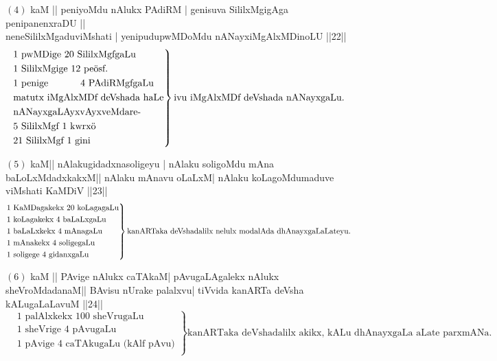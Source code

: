 \eject


$(4)$ kaM || peniyoMdu nAlukx PAdiRM | genisuva SililxMgigAga penipanenxraDU ||\\ 
neneSililxMgaduviMshati | yenipudupwMDoMdu nANayxiMgAlxMDinoLU ||22||
\begin{equation*}
\left.
\begin{aligned}
&\text{$1$ pwMDige $20$ SililxMgfgaLu}\\
&\text{$1$ SililxMgige $12$ pe\char'366sf.}\\
&\text{$1$ penige \qq $4$ PAdiRMgfgaLu}\\
&\text{matutx iMgAlxMDf deVshada haLe}\\
&\text{nANayxgaLAyxvAyxveMdare-}\\
&\text{$5$ SililxMgf $1$ kwrx\char'366}\\
&\text{$21$ SililxMgf $1$ gini}\\
\end{aligned}
\right\}
\text {ivu iMgAlxMDf deVshada nANayxgaLu.}
\end{equation*}

$(5)$ kaM|| nAlakugidadxnasoligeyu | nAlaku soligoMdu mAna baLoLxMdadxkakxM|| nAlaku mAnavu oLaLxM| nAlaku koLagoMdumaduve viMshati KaMDiV ||23||
\begin{equation*}
\left.
\begin{aligned}
&\text {$1$ KaMDagakekx $20$ koLagagaLu}\\
&\text {$1$ koLagakekx  $4$ baLaLxgaLu}\\
&\text {$1$ baLaLxkekx $4$ mAnagaLu}\\
&\text {$1$ mAnakekx $4$ soligegaLu}\\
&\text {$1$ soligege $4$ gidanxgaLu}\\
\end{aligned}
\right\}
\text {kanARTaka deVshadalilx nelulx modalAda dhAnayxgaLaLateyu.}\\
\end{equation*}

$(6)$ kaM || PAvige nAlukx caTAkaM| pAvugaLAgalekx nAlukx sheVroMdadanaM|| BAvisu nUrake palalxvu| tiVvida kanARTa deVsha kALugaLaLavuM ||24||
\begin{equation*}
\left.
\begin{aligned}
&\text {$1$ palAlxkekx $100$ sheVrugaLu}\\
&\text {$1$ sheVrige $4$ pAvugaLu}\\
&\text {$1$ pAvige $4$ caTAkugaLu (kAlf pAvu)}\\
\end{aligned}
\right\}
\text {kanARTaka deVshadalilx akikx, kALu dhAnayxgaLa aLate parxmANa.}
\end{equation*}

